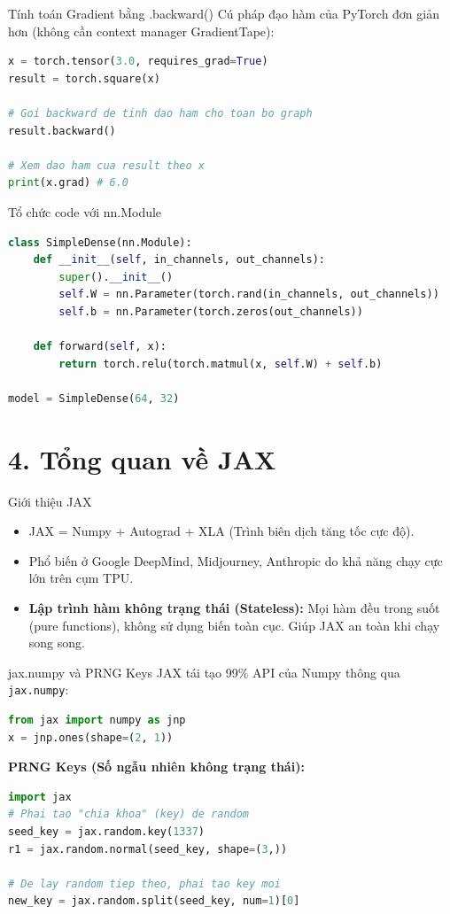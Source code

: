 \documentclass[aspectratio=169]{beamer}
\begin{document}
\begin{frame}[fragile]{Tính toán Gradient bằng .backward()}
    Cú pháp đạo hàm của PyTorch đơn giản hơn (không cần context manager GradientTape):
    \begin{lstlisting}[language=Python]
x = torch.tensor(3.0, requires_grad=True)
result = torch.square(x)

# Goi backward de tinh dao ham cho toan bo graph
result.backward()

# Xem dao ham cua result theo x
print(x.grad) # 6.0
    \end{lstlisting}
\end{frame}

\begin{frame}[fragile]{Tổ chức code với nn.Module}
    \begin{lstlisting}[language=Python]
class SimpleDense(nn.Module):
    def __init__(self, in_channels, out_channels):
        super().__init__()
        self.W = nn.Parameter(torch.rand(in_channels, out_channels))
        self.b = nn.Parameter(torch.zeros(out_channels))
        
    def forward(self, x):
        return torch.relu(torch.matmul(x, self.W) + self.b)
        
model = SimpleDense(64, 32)
    \end{lstlisting}
\end{frame}

\section{4. Tổng quan về JAX}

\begin{frame}{Giới thiệu JAX}
    \begin{itemize}
        \item JAX = Numpy + Autograd + XLA (Trình biên dịch tăng tốc cực độ).
        \item Phổ biến ở Google DeepMind, Midjourney, Anthropic do khả năng chạy cực lớn trên cụm TPU.
        \item \textbf{Lập trình hàm không trạng thái (Stateless):} Mọi hàm đều trong suốt (pure functions), không sử dụng biến toàn cục. Giúp JAX an toàn khi chạy song song.
    \end{itemize}
\end{frame}

\begin{frame}[fragile]{jax.numpy và PRNG Keys}
    JAX tái tạo 99\% API của Numpy thông qua \texttt{jax.numpy}:
    \begin{lstlisting}[language=Python]
from jax import numpy as jnp
x = jnp.ones(shape=(2, 1))
    \end{lstlisting}
    \textbf{PRNG Keys (Số ngẫu nhiên không trạng thái):}
    \begin{lstlisting}[language=Python]
import jax
# Phai tao "chia khoa" (key) de random
seed_key = jax.random.key(1337)
r1 = jax.random.normal(seed_key, shape=(3,))

# De lay random tiep theo, phai tao key moi
new_key = jax.random.split(seed_key, num=1)[0]
    \end{lstlisting}
\end{frame}
\end{document}
